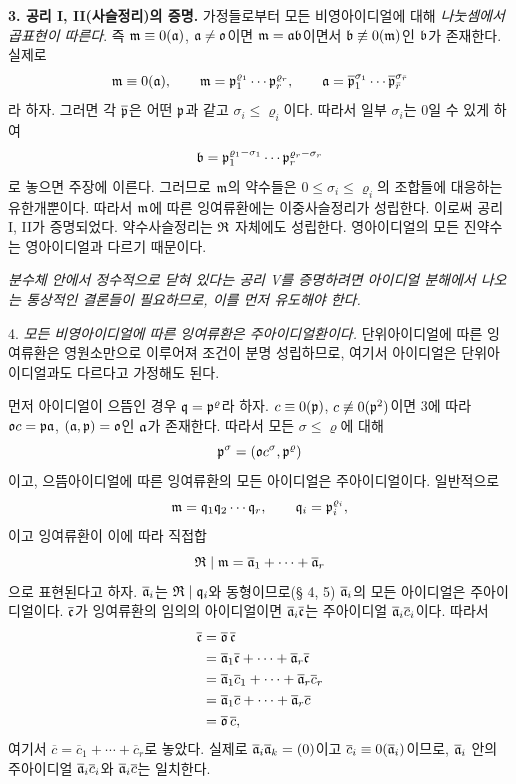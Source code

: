 \textbf{3. 공리 I, II(사슬정리)의 증명.} 가정들로부터 모든 비영아이디얼에 대해 \emph{나눗셈에서 곱표현이 따른다}. 즉 \(\mathfrak{m}\equiv0(\mathfrak{a})\), \(\mathfrak{a}\ne\mathfrak{o}\)이면 \(\mathfrak{m}=\mathfrak{a}\mathfrak{b}\)이면서 \(\mathfrak{b}\not\equiv0(\mathfrak{m})\)인 \(\mathfrak{b}\)가 존재한다. 실제로
\[
        \mathfrak{m}\equiv0(\mathfrak{a}),\qquad
        \mathfrak{m}=\mathfrak{p}_1^{\varrho_1}\cdots\mathfrak{p}_r^{\varrho_r},\qquad
        \mathfrak{a}=\overline{\mathfrak{p}}_1^{\sigma_1}\cdots
             \overline{\mathfrak{p}}_{\bar r}^{\sigma_{\bar r}}
\]
라 하자. 그러면 각 \(\overline{\mathfrak{p}}\)은 어떤 \(\mathfrak{p}\)과 같고 \(\sigma_i\le\varrho_i\)이다. 따라서 일부 \(\sigma_i\)는 0일 수 있게 하여
\[
        \mathfrak{b}=\mathfrak{p}_1^{\varrho_1-\sigma_1}\cdots
             \mathfrak{p}_r^{\varrho_r-\sigma_r}
\]
로 놓으면 주장에 이른다. 그러므로 \(\mathfrak{m}\)의 약수들은 \(0\le\sigma_i\le\varrho_i\)의 조합들에 대응하는 유한개뿐이다. 따라서 \(\mathfrak{m}\)에 따른 잉여류환에는 이중사슬정리가 성립한다. 이로써 공리 I, II가 증명되었다. 약수사슬정리는 \(\mathfrak{R}\) 자체에도 성립한다. 영아이디얼의 모든 진약수는 영아이디얼과 다르기 때문이다.

\emph{분수체 안에서 정수적으로 닫혀 있다는 공리 V를 증명하려면 아이디얼 분해에서 나오는 통상적인 결론들이 필요하므로, 이를 먼저 유도해야 한다.}

4. \emph{모든 비영아이디얼에 따른 잉여류환은 주아이디얼환이다.} 단위아이디얼에 따른 잉여류환은 영원소만으로 이루어져 조건이 분명 성립하므로, 여기서 아이디얼은 단위아이디얼과도 다르다고 가정해도 된다.

먼저 아이디얼이 으뜸인 경우 \(\mathfrak{q}=\mathfrak{p}^\varrho\)라 하자. \(c\equiv0(\mathfrak{p})\), \(c\not\equiv0(\mathfrak{p}^2)\)이면 3에 따라 \(\mathfrak{o} c=\mathfrak{p}\mathfrak{a}\), \((\mathfrak{a},\mathfrak{p})=\mathfrak{o}\)인 \(\mathfrak{a}\)가 존재한다. 따라서 모든 \(\sigma\le\varrho\)에 대해
\[
        \mathfrak{p}^\sigma=(\mathfrak{o} c^\sigma,\mathfrak{p}^\varrho)
\]
이고, 으뜸아이디얼에 따른 잉여류환의 모든 아이디얼은 주아이디얼이다. 일반적으로
\[
        \mathfrak{m}=\mathfrak{q}_1\mathfrak{q}_2\cdots\mathfrak{q}_r,
        \qquad \mathfrak{q}_i=\mathfrak{p}_i^{\varrho_i},
\]
이고 잉여류환이 이에 따라 직접합
\[
        \mathfrak{R}\mid\mathfrak{m}=\overline{\mathfrak{a}}_1+\cdots+\overline{\mathfrak{a}}_r
\]
으로 표현된다고 하자. \(\overline{\mathfrak{a}}_i\)는 \(\mathfrak{R}\mid\mathfrak{q}_i\)와 동형이므로(§ 4, 5) \(\overline{\mathfrak{a}}_i\)의 모든 아이디얼은 주아이디얼이다. \(\overline{\mathfrak{c}}\)가 잉여류환의 임의의 아이디얼이면 \(\overline{\mathfrak{a}}_i\overline{\mathfrak{c}}\)는 주아이디얼 \(\overline{\mathfrak{a}}_i\overline c_i\)이다. 따라서
\[
\begin{aligned}
        \overline{\mathfrak{c}}
        &=\overline{\mathfrak{o}}\,\overline{\mathfrak{c}}\\
        &=\overline{\mathfrak{a}}_1\overline{\mathfrak{c}}+\cdots+
          \overline{\mathfrak{a}}_r\overline{\mathfrak{c}}\\
        &=\overline{\mathfrak{a}}_1\overline c_1+\cdots+
          \overline{\mathfrak{a}}_r\overline c_r\\
        &=\overline{\mathfrak{a}}_1\overline c+\cdots+
          \overline{\mathfrak{a}}_r\overline c\\
        &=\overline{\mathfrak{o}}\,\overline c,
\end{aligned}
\]
여기서 \(\overline c=\overline c_1+\cdots+\overline c_r\)로 놓았다. 실제로 \(\overline{\mathfrak{a}}_i\overline{\mathfrak{a}}_k=(0)\)이고 \(\overline c_i\equiv0(\overline{\mathfrak{a}}_i)\)이므로, \(\overline{\mathfrak{a}}_i\) 안의 주아이디얼 \(\overline{\mathfrak{a}}_i\overline c_i\)와 \(\overline{\mathfrak{a}}_i\overline c\)는 일치한다.

